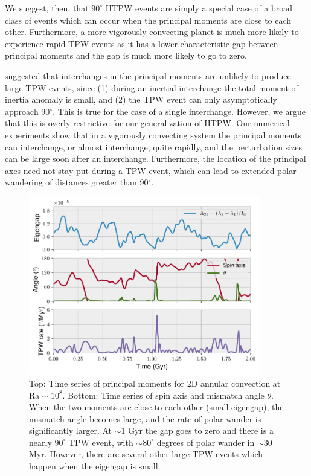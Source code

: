 \documentclass[preprint,12pt,authoryear]{elsarticle}
\begin{document}
We suggest, then, that $90^\circ$ IITPW events are simply a special case of a broad class of events which can occur
when the principal moments are close to each other. 
Furthermore, a more vigorously convecting planet is much more likely to experience rapid TPW events
as it has a lower characteristic gap between principal moments and the gap is much more likely to go to zero.

\citet{tsai2007theoretical} suggested that interchanges in the principal moments are unlikely to produce large
TPW events, since (1) during an inertial interchange the total moment of inertia anomaly is small, and
(2) the TPW event can only asymptotically approach 90$^\circ$.
This is true for the case of a single interchange. However, we argue that this is overly restrictive
for our generalization of IITPW.
Our numerical experiments show that in a vigorously convecting system the principal moments can
interchange, or almost interchange, quite rapidly, and the perturbation sizes can be large soon after an interchange.
Furthermore, the location of the principal axes need not stay put during a TPW event,
which can lead to extended polar wandering of distances greater than 90$^\circ$.

\begin{figure}
\centering
\includegraphics[width=0.9\textwidth]{figures/misfit.pdf}
\caption[Principal moments and mismatch angle in a convecting matle.]{Top: Time series of principal moments for 2D annular convection at $\mathrm{Ra}\sim10^8$.  Bottom: Time series of spin axis and mismatch angle $\theta$.  When the two moments are close to each other (small eigengap), the mismatch angle becomes large, and the rate of polar wander is significantly larger. At $\sim$1 Gyr the gap goes to zero and there is a nearly $90^\circ$ TPW event, with $\sim80^\circ$ degrees of polar wander in $\sim$30 Myr. However, there are several other large TPW events which happen when the eigengap is small.}
\label{fig:misfit}
\end{figure}
\end{document}

